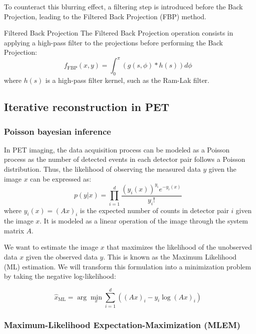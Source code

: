 To counteract this blurring effect, a filtering step is introduced before the Back Projection, leading to the Filtered Back Projection (FBP) method.

\begin{definition}{Filtered Back Projection}
    The Filtered Back Projection operation consists in applying a high-pass filter to the projections before performing the Back Projection:
    \begin{equation}
        f_{\text{FBP}}(x, y) = \int_{0}^{\pi} \left( g(s, \phi) * h(s) \right) d\phi
    \end{equation}
    where $h(s)$ is a high-pass filter kernel, such as the Ram-Lak filter.
\end{definition}

\subsection{Iterative reconstruction in PET}

\subsubsection{Poisson bayesian inference}

In PET imaging, the data acquisition process can be modeled as a Poisson process as the number of detected events in each detector pair follows a Poisson distribution.
Thus, the likelihood of observing the measured data $y$ given the image $x$ can be expressed as:
\begin{equation}
    p(y|x) = \prod_{i=1}^{d} \frac{(y_i(x))^{y_i} e^{-y_i(x)}}{y_i!}
\end{equation}
where $y_i(x) = (Ax)_i$ is the expected number of counts in detector pair $i$ given the image $x$. It is modeled as a linear operation of the image through the system matrix $A$.

We want to estimate the image $x$ that maximizes the likelihood of the unobserved data $x$ given the observed data $y$. This is known as the Maximum Likelihood (ML) estimation. We will transform this formulation into a minimization problem by taking the negative log-likelihood:

\begin{equation}
    \hat{x}_{\text{ML}} = \arg \min_{x} \sum_{i=1}^{d} \left( (Ax)_i - y_i \log (Ax)_i\right)
    \label{eq:ml_estimation}
\end{equation}

\subsubsection{Maximum-Likelihood Expectation-Maximization (MLEM)}

